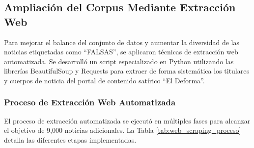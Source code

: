 \subsection{Ampliación del Corpus Mediante Extracción Web}

Para mejorar el balance del conjunto de datos y aumentar la diversidad de las noticias etiquetadas como ``FALSAS'', se aplicaron técnicas de extracción web automatizada. Se desarrolló un script especializado en Python utilizando las librerías BeautifulSoup y Requests para extraer de forma sistemática los titulares y cuerpos de noticia del portal de contenido satírico ``El Deforma''.

\subsubsection{Proceso de Extracción Web Automatizada}

El proceso de extracción automatizada se ejecutó en múltiples fases para alcanzar el objetivo de 9,000 noticias adicionales. La Tabla \ref{tab:web_scraping_proceso} detalla las diferentes etapas implementadas.

